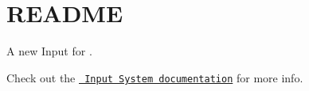 \chapter{README}
\hypertarget{md__hey_tea_9_2_library_2_package_cache_2com_8unity_8inputsystem_0d1_86_83_2_r_e_a_d_m_e}{}\label{md__hey_tea_9_2_library_2_package_cache_2com_8unity_8inputsystem_0d1_86_83_2_r_e_a_d_m_e}
A new Input  for .

Check out the \href{http://docs.unity3d.com/Packages/com.unity.inputsystem@latest/}{\texttt{ Input System documentation}} for more info. 
